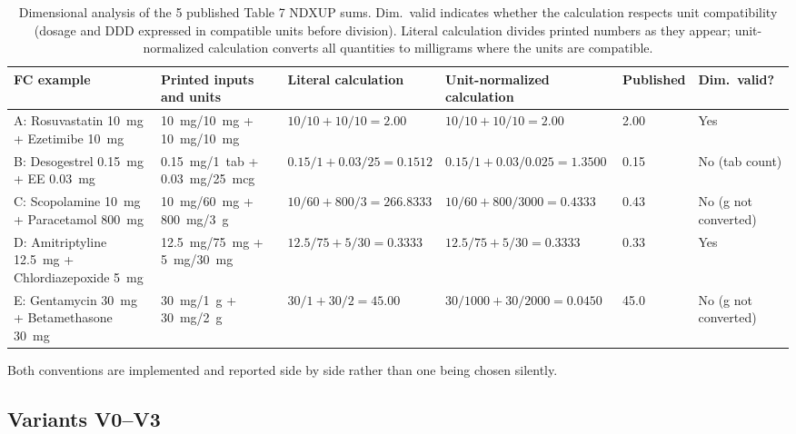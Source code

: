 \documentclass[twocolumn,a4paper]{elsarticle}
\begin{document}
\begin{table}[htbp]
\centering\small
\caption{Dimensional analysis of the 5 published Table 7 NDXUP sums. Dim.\ valid indicates whether the calculation respects unit compatibility (dosage and DDD expressed in compatible units before division). Literal calculation divides printed numbers as they appear; unit-normalized calculation converts all quantities to milligrams where the units are compatible.}
\label{tab:table7-dim}
\begin{tabular}{@{}p{2.0cm}p{2.4cm}p{3.2cm}p{3.2cm}p{1.6cm}p{2.0cm}@{}}
\toprule
FC example & Printed inputs and units & Literal calculation & Unit-normalized calculation & Published & Dim.\ valid? \\
\midrule
A: Rosuvastatin 10~mg + Ezetimibe 10~mg & 10~mg/10~mg + 10~mg/10~mg & $10/10 + 10/10 = 2.00$ & $10/10 + 10/10 = 2.00$ & 2.00 & Yes \\
B: Desogestrel 0.15~mg + EE 0.03~mg & 0.15~mg/1~tab + 0.03~mg/25~mcg & $0.15/1 + 0.03/25 = 0.1512$ & $0.15/1 + 0.03/0.025 = 1.3500$ & 0.15 & No (tab count) \\
C: Scopolamine 10~mg + Paracetamol 800~mg & 10~mg/60~mg + 800~mg/3~g & $10/60 + 800/3 = 266.8333$ & $10/60 + 800/3000 = 0.4333$ & 0.43 & No (g not converted) \\
D: Amitriptyline 12.5~mg + Chlordiazepoxide 5~mg & 12.5~mg/75~mg + 5~mg/30~mg & $12.5/75 + 5/30 = 0.3333$ & $12.5/75 + 5/30 = 0.3333$ & 0.33 & Yes \\
E: Gentamycin 30~mg + Betamethasone 30~mg & 30~mg/1~g + 30~mg/2~g & $30/1 + 30/2 = 45.00$ & $30/1000 + 30/2000 = 0.0450$ & 45.0 & No (g not converted) \\
\bottomrule
\end{tabular}
\end{table}

Both conventions are implemented and reported side by side rather than one being chosen silently.

\subsection{Variants V0--V3}
\label{sec:results-variants}
\end{document}
